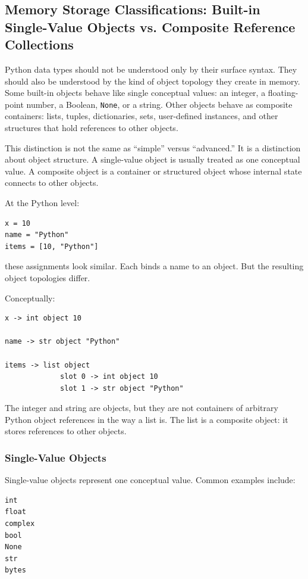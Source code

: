 \subsection{Memory Storage Classifications: Built-in Single-Value Objects vs. Composite Reference Collections}

Python data types should not be understood only by their surface syntax. They should also be understood by the kind of object topology they create in memory. Some built-in objects behave like single conceptual values: an integer, a floating-point number, a Boolean, \texttt{None}, or a string. Other objects behave as composite containers: lists, tuples, dictionaries, sets, user-defined instances, and other structures that hold references to other objects.

This distinction is not the same as ``simple'' versus ``advanced.'' It is a distinction about object structure. A single-value object is usually treated as one conceptual value. A composite object is a container or structured object whose internal state connects to other objects.

At the Python level:

\begin{verbatim}
x = 10
name = "Python"
items = [10, "Python"]
\end{verbatim}

these assignments look similar. Each binds a name to an object. But the resulting object topologies differ.

Conceptually:

\begin{verbatim}
x -> int object 10

name -> str object "Python"

items -> list object
             slot 0 -> int object 10
             slot 1 -> str object "Python"
\end{verbatim}

The integer and string are objects, but they are not containers of arbitrary Python object references in the way a list is. The list is a composite object: it stores references to other objects.

\subsubsection*{Single-Value Objects}

Single-value objects represent one conceptual value. Common examples include:

\begin{verbatim}
int
float
complex
bool
None
str
bytes
\end{verbatim}

